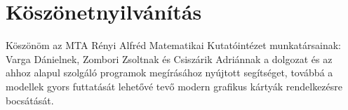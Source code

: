 \chapter*{Köszönetnyilvánítás}

Köszönöm az MTA Rényi Alfréd Matematikai Kutatóintézet munkatársainak: Varga Dánielnek, Zombori Zsoltnak és Csiszárik Adriánnak a dolgozat és az ahhoz alapul szolgáló programok megírásához nyújtott segítséget, továbbá a modellek gyors futtatását lehetővé tevő modern grafikus kártyák rendelkezésre bocsátását.